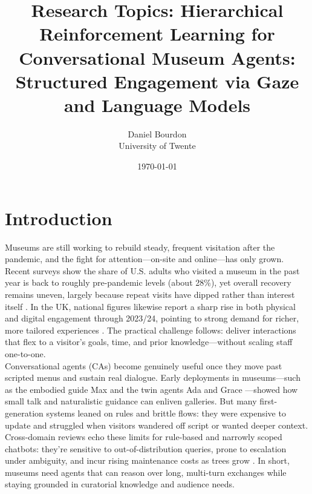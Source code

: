 \documentclass[12pt]{article}
\begin{document}
\title{Research Topics: Hierarchical Reinforcement Learning for Conversational Museum Agents: Structured Engagement via Gaze and Language Models}
\author{Daniel Bourdon \\ University of Twente}
\date{\today}
\maketitle\section{Introduction}
Museums are still working to rebuild steady, frequent visitation after the pandemic, and the fight for attention—on-site and online—has only grown. Recent surveys show the share of U.S. adults who visited a museum in the past year is back to roughly pre-pandemic levels (about 28\%), yet overall recovery remains uneven, largely because repeat visits have dipped rather than interest itself \citep{aam2023survey,aam2023gaps}. In the UK, national figures likewise report a sharp rise in both physical and digital engagement through 2023/24, pointing to strong demand for richer, more tailored experiences \citep{dcms2024engagement}. The practical challenge follows: deliver interactions that flex to a visitor’s goals, time, and prior knowledge—without scaling staff one-to-one.\\

Conversational agents (CAs) become genuinely useful once they move past scripted menus and sustain real dialogue. Early deployments in museums—such as the embodied guide Max \citep{kopp2005conversational} and the twin agents Ada and Grace \citep{traum2012ada}—showed how small talk and naturalistic guidance can enliven galleries. But many first-generation systems leaned on rules and brittle flows: they were expensive to update and struggled when visitors wandered off script or wanted deeper context. Cross-domain reviews echo these limits for rule-based and narrowly scoped chatbots: they’re sensitive to out-of-distribution queries, prone to escalation under ambiguity, and incur rising maintenance costs as trees grow \citep{laymouna2024jmir,gruenhagen2024education}. In short, museums need agents that can reason over long, multi-turn exchanges while staying grounded in curatorial knowledge and audience needs.\\
\end{document}
